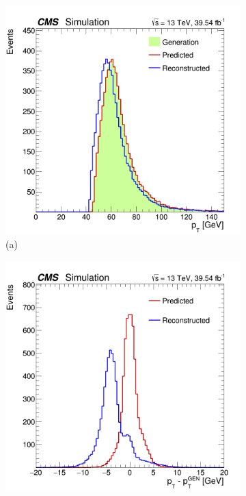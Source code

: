 \begin{figure}[!ht]
    \captionsetup[subfigure]{labelformat=empty}
    \vspace*{-0.2cm}
    \centering
    \setlength{\mylength}{\textwidth}
    \begin{subfigure}[t]{0.50\mylength}
        \centering
        \includegraphics[width=0.49\mylength]{resources/plots/D0Star_2body_model_pt.png}
        \vspace*{-0.2cm}
        \caption{\footnotesize (a)}
    \end{subfigure}%
    \begin{subfigure}[t]{0.50\mylength}
        \centering
        \includegraphics[width=0.49\mylength]{resources/plots/D0Star_2body_model_pt_residuals.png}

\end{subfigure}
\end{figure}
